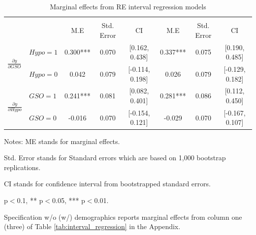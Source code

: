 \documentclass[12pt]{article}
\begin{document}
\begin{table}[H]
\centering
\footnotesize
\caption{Marginal effects from RE interval regression models}
\label{tab: Regression}
\begin{tabular}{llcccccc}
\toprule
 & &  &  \\
 & & M.E & Std. Error& CI & M.E & Std. Error&CI \\ \midrule
{} & $Hypo=1$ &0.300*** &0.070& [0.162, 0.438] &0.337***&0.075 & [0.190, 0.485]\\
                                              & $Hypo=0$ &0.042 &0.079& [-0.114, 0.198] &0.026&0.079 & [-0.129, 0.182]\\ \midrule

                                              
 & $GSO=1$ &0.241***  & 0.081&[0.082, 0.401]&0.281*** & 0.086&[0.112, 0.450]\\
                                                & $GSO=0$ &-0.016 &0.070 &[-0.154, 0.121]&-0.029 &0.070&[-0.167, 0.107] \\ \bottomrule


\end{tabular}
\begin{tablenotes}
\footnotesize

\item Notes: ME stands for marginal effects.
\item Std. Error stands for Standard errors which are based on 1,000 bootstrap replications.
\item CI stands for confidence interval from bootstrapped standard errors.
\item * p$<$0.1, ** p$<$0.05, *** p$<$0.01.
\item Specification w/o (w/) demographics reports marginal effects from column one (three) of Table \ref{tab:interval_regression} in the Appendix.
\end{tablenotes}
\end{table}

\end{document}
